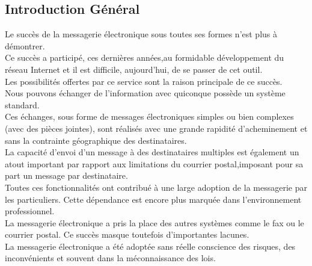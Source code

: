\documentclass[french]{report}
\begin{document}
\tableofcontents

\baselineskip=2.0pt
\renewcommand*{\thepage}{\arabic{page}}%
\setcounter{page}{1}%
\newpage
\begin{center}
\section*{\huge Introduction Général}
\end{center}
\par
\LARGE Le succès de la messagerie électronique sous toutes ses formes n'est plus à démontrer. \\
Ce succès a participé, ces dernières années,au formidable développement du réseau Internet et il est difficile, aujourd'hui, de se passer de cet outil.\\ 
Les possibilités offertes par ce service sont la raison principale de ce succès.\\ 
Nous pouvons échanger de l'information avec quiconque possède un système standard.\\
Ces échanges, sous forme de messages électroniques simples ou bien complexes (avec des pièces jointes), sont réalisés avec une grande rapidité d'acheminement et sans la contrainte géographique des destinataires.\\
La capacité d'envoi d'un message à des destinataires multiples est également un atout important par rapport aux limitations du courrier postal,imposant pour sa part un message par destinataire.\\
Toutes ces fonctionnalités ont contribué à une large adoption de la messagerie par les particuliers. 
Cette dépendance est encore plus marquée dans l'environnement professionnel.\\
La messagerie électronique a pris la place des autres systèmes comme le fax ou le courrier postal.
Ce succès masque toutefois d'importantes lacunes.\\
La messagerie électronique a été adoptée sans réelle conscience des risques, des inconvénients et souvent dans la méconnaissance des lois.\\
\end{document}
